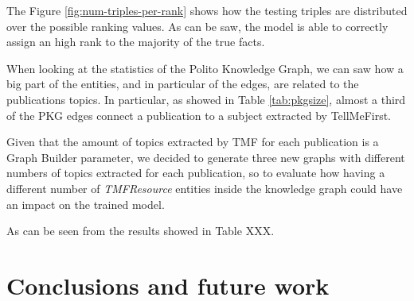 \documentclass[%
    corpo=13.5pt,
    twoside,
    oldstyle,
    tipotesi=magistrale,
    greek,
    evenboxes
]{toptesi}
\begin{document}
The Figure \ref{fig:num-triples-per-rank} shows how the testing triples are
distributed over the possible ranking values.
As can be saw, the model is able to correctly assign an high rank to the
majority of the true facts.
\newline

When looking at the statistics of the Polito Knowledge Graph, we can saw how
a big part of the entities, and in particular of the edges, are related to the
publications topics. In particular, as showed in Table \ref{tab:pkgsize},
almost a third of the PKG edges connect a publication to a subject extracted by
TellMeFirst.

Given that the amount of topics extracted by TMF for each publication is a
Graph Builder parameter, we decided to generate three new graphs with
different numbers of topics extracted for each publication, so to evaluate
how having a different number of \emph{TMFResource} entities inside the
knowledge graph could have an impact on the trained model.

As can be seen from the results showed in Table XXX.







\chapter{Conclusions and future work}





\end{document}

